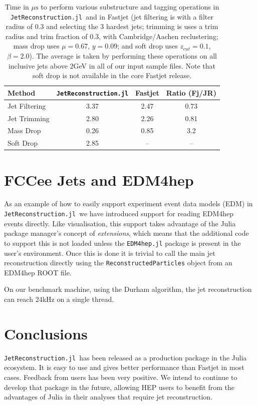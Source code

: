\documentclass{webofc}
\newcommand{\JR}{\texttt{JetReconstruction.jl}}
\begin{document}
\begin{table}[ht]
    \begin{center}
        \begin{tabular}{l|ccc}
            \textbf{Method} & \textbf{\JR} & \textbf{Fastjet} & \textbf{Ratio (Fj/JR)}\\
            \hline
            Jet Filtering & 3.37 & 2.47 & 0.73 \\
            Jet Trimming & 2.80 & 2.26 & 0.81 \\
            Mass Drop & 0.26 & 0.85 & 3.2 \\
            Soft Drop & 2.85 & -- & -- \\
        \end{tabular}
        \caption{Time in $\mu\mathrm{s}$ to perform various substructure and
        tagging operations in \JR\ and in Fastjet (jet filtering is with a
        filter radius of 0.3 and selecting the 3 hardest jets; trimming is uses
        a trim radius and trim fraction of 0.3, with Cambridge/Aachen
        reclustering; mass drop uses $\mu = 0.67$, $y=0.09$; and soft drop
        uses $z_{cut}=0.1$, $\beta=2.0$). The average is taken by performing these
        operations on all inclusive jets above 2GeV in all of our input sample
        files. Note that soft drop is not available in the core Fastjet release.}
        \label{tab:subtag}
    \end{center}
\end{table}

\section{FCCee Jets and EDM4hep}
\label{sec:fccee}

As an example of how to easily support experiment event data models (EDM) in \JR\ we have
introduced support for reading EDM4hep~\cite{Gaede:2022leb} events directly. Like
visualisation, this support takes advantage of the Julia package manager's
concept of \emph{extensions}, which means that the additional code to support
this is not loaded unless the \texttt{EDM4hep.jl} package is present in the
user's environment. Once this is done it is trivial to call the main jet
reconstruction directly using the \texttt{ReconstructedParticles} object from an
EDM4hep ROOT file.

On our benchmark machine, using the Durham algorithm, the jet reconstruction can
reach 24kHz on a single thread.

\section{Conclusions}
\label{sec:conclusions}

\JR\ has been released as a production package in the Julia ecosystem. It is
easy to use and gives better performance than Fastjet in most cases. Feedback
from users has been very positive. We intend to continue to develop that package
in the future, allowing HEP users to benefit from the advantages of Julia in
their analyses that require jet reconstruction.

\sloppy
\raggedright

\end{document}

